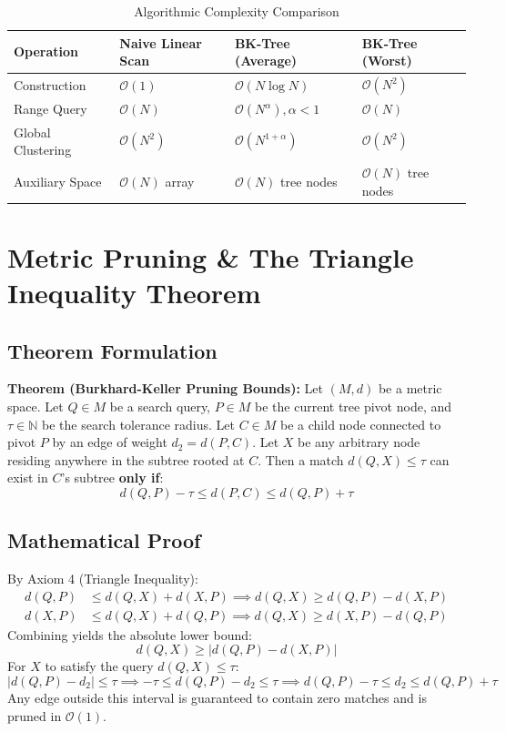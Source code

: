 \documentclass[11pt,a4paper]{article}
\begin{document}
\begin{table}[ht]
\centering
\small
\caption{Algorithmic Complexity Comparison}
\begin{tabular}{llll}
\toprule
\textbf{Operation} & \textbf{Naive Linear Scan} & \textbf{BK-Tree (Average)} & \textbf{BK-Tree (Worst)} \\
\midrule
Construction & $\mathcal{O}(1)$ & $\mathcal{O}(N \log N)$ & $\mathcal{O}(N^2)$ \\
Range Query & $\mathcal{O}(N)$ & $\mathcal{O}(N^\alpha), \alpha < 1$ & $\mathcal{O}(N)$ \\
Global Clustering & $\mathcal{O}(N^2)$ & $\mathcal{O}(N^{1+\alpha})$ & $\mathcal{O}(N^2)$ \\
Auxiliary Space & $\mathcal{O}(N)$ array & $\mathcal{O}(N)$ tree nodes & $\mathcal{O}(N)$ tree nodes \\
\bottomrule
\end{tabular}
\end{table}

\section{Metric Pruning \& The Triangle Inequality Theorem}
\subsection{Theorem Formulation}
\textbf{Theorem (Burkhard-Keller Pruning Bounds):} Let $(M, d)$ be a metric space. Let $Q \in M$ be a search query, $P \in M$ be the current tree pivot node, and $\tau \in \mathbb{N}$ be the search tolerance radius. Let $C \in M$ be a child node connected to pivot $P$ by an edge of weight $d_2 = d(P, C)$. Let $X$ be any arbitrary node residing anywhere in the subtree rooted at $C$. Then a match $d(Q, X) \le \tau$ can exist in $C$'s subtree \textbf{only if}:
\begin{equation}
d(Q, P) - \tau \le d(P, C) \le d(Q, P) + \tau
\end{equation}

\subsection{Mathematical Proof}
By Axiom 4 (Triangle Inequality):
\begin{align}
d(Q, P) &\le d(Q, X) + d(X, P) \implies d(Q, X) \ge d(Q, P) - d(X, P) \\
d(X, P) &\le d(Q, X) + d(Q, P) \implies d(Q, X) \ge d(X, P) - d(Q, P)
\end{align}
Combining yields the absolute lower bound:
\begin{equation}
d(Q, X) \ge |d(Q, P) - d(X, P)|
\end{equation}
For $X$ to satisfy the query $d(Q, X) \le \tau$:
\begin{equation}
|d(Q, P) - d_2| \le \tau \implies -\tau \le d(Q, P) - d_2 \le \tau \implies d(Q, P) - \tau \le d_2 \le d(Q, P) + \tau
\end{equation}
Any edge outside this interval is guaranteed to contain zero matches and is pruned in $\mathcal{O}(1)$.
\end{document}
